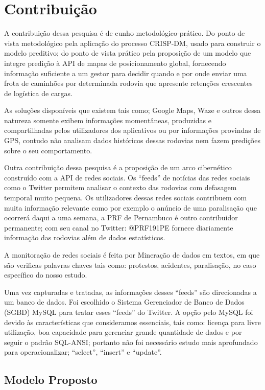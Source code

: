 \chapter{Contribuição}\label{meto}

A contribuição dessa pesquisa é de cunho metodológico-prático.
Do ponto de vista metodológico pela aplicação do processo CRISP-DM, usado para construir o modelo preditivo; do ponto de vista prático 
pela proposição de um modelo que integre predição à API de mapas de posicionamento global, fornecendo informação suficiente a um gestor para decidir quando 
e por onde enviar uma frota de caminhões por determinada rodovia que apresente retenções crescentes de logística de cargas. 

As soluções disponíveis que existem tais como; Google Maps, Waze e outros dessa natureza somente exibem informações momentâneas, produzidas e compartilhadas pelos utilizadores 
dos aplicativos ou por informações provindas de GPS, contudo não analisam dados históricos dessas rodovias nem fazem predições sobre o seu comportamento.

Outra contribuição dessa pesquisa é a proposição de um arco cibernético construído com a API de redes sociais.
Os ``feeds'' de notícias das redes sociais como o Twitter permitem analisar o contexto das rodovias com defasagem temporal muito pequena.
Os utilizadores dessas redes sociais contribuem com muita informação relevante como por exemplo o anúncio de uma paralisação que ocorrerá 
daqui a uma semana, a PRF de Pernambuco é outro contribuidor permanente; com seu canal no Twitter: @PRF191PE fornece diariamente informação das rodovias 
além de dados estatísticos. 

A monitoração de redes sociais é feita por Mineração de dados em textos, em que são verificas palavras chaves tais como: protestos, acidentes, paralisação, no caso
específico do nosso estudo.

Uma vez capturadas e tratadas, as informações desses ``feeds'' são direcionadas a um banco de dados. 
Foi escolhido o Sistema Gerenciador de Banco de Dados (SGBD) MySQL para tratar esses ``feeds'' do Twitter. 
A opção pelo MySQL foi devido às características que consideramos essenciais, tais como: licença para livre utilização, boa capacidade para gerenciar grande quantidade de 
dados e por seguir o padrão SQL-ANSI; portanto não foi necessário estudo mais aprofundado para operacionalizar; ``select'', ``insert'' e ``update''.


\section{Modelo Proposto}

